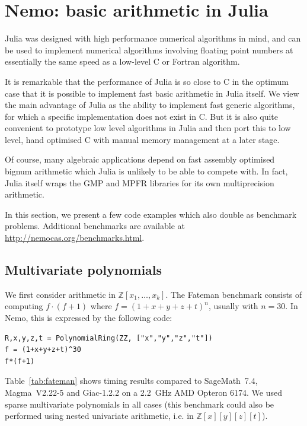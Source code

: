 \documentclass{sig-alternate-05-2015}
\begin{document}
\section{Nemo: basic arithmetic in Julia}

Julia was designed with high performance numerical algorithms in mind, and can be used to
implement numerical algorithms involving floating point numbers at essentially the same
speed as a low-level C or Fortran algorithm. 

It is remarkable that the performance of Julia is so close to C in the optimum case that
it is possible to implement fast basic arithmetic in Julia itself. We view the main
advantage of Julia as the ability to implement fast generic algorithms, for which a specific
implementation does not exist in C. But it is also quite convenient to prototype low level
algorithms in Julia and then port this to low level, hand optimised C with manual memory
management at a later stage.

Of course, many algebraic applications depend on fast assembly optimised bignum arithmetic
which Julia is unlikely to be able to compete with. In fact, Julia itself wraps the GMP
\cite{gmp} and MPFR \cite{mpfr} libraries for its own multiprecision arithmetic.

In this section, we present a few code examples which also double as
benchmark problems.
Additional benchmarks are available
at \url{http://nemocas.org/benchmarks.html}.

\subsection{Multivariate polynomials}

We first consider arithmetic in $\mathbb{Z}[x_1,\ldots,x_k]$.
The Fateman benchmark consists of computing
$f \cdot (f+1)$ where $f = (1 + x + y + z + t)^n$,
usually with $n = 30$. In Nemo, this is expressed by the following code:

\begin{verbatim}
R,x,y,z,t = PolynomialRing(ZZ, ["x","y","z","t"])
f = (1+x+y+z+t)^30
f*(f+1)
\end{verbatim}

Table~\ref{tab:fateman} shows timing results compared to
SageMath~7.4, Magma~V2.22-5 and Giac-1.2.2
on a 2.2~GHz AMD Opteron 6174.
We used sparse multivariate polynomials in all
cases (this benchmark could also be performed
using nested univariate arithmetic, i.e. in $\mathbb{Z}[x][y][z][t]$).
\end{document}
